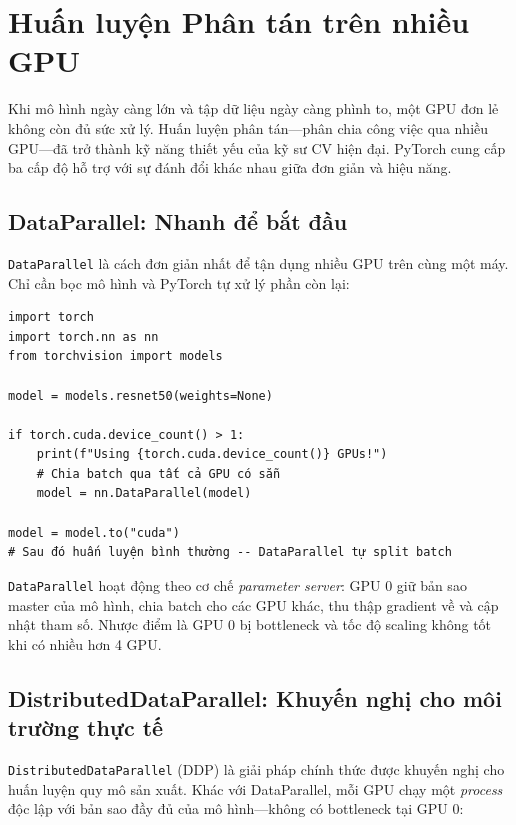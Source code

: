 \section{Huấn luyện Phân tán trên nhiều GPU}
\label{sec:distributed_training}

Khi mô hình ngày càng lớn và tập dữ liệu ngày càng phình to, một GPU đơn lẻ không còn đủ sức xử lý. Huấn luyện phân tán---phân chia công việc qua nhiều GPU---đã trở thành kỹ năng thiết yếu của kỹ sư CV hiện đại. PyTorch cung cấp ba cấp độ hỗ trợ với sự đánh đổi khác nhau giữa đơn giản và hiệu năng.

\subsection*{DataParallel: Nhanh để bắt đầu}

\texttt{DataParallel} là cách đơn giản nhất để tận dụng nhiều GPU trên cùng một máy. Chỉ cần bọc mô hình và PyTorch tự xử lý phần còn lại:

\begin{verbatim}
import torch
import torch.nn as nn
from torchvision import models

model = models.resnet50(weights=None)

if torch.cuda.device_count() > 1:
    print(f"Using {torch.cuda.device_count()} GPUs!")
    # Chia batch qua tất cả GPU có sẵn
    model = nn.DataParallel(model)

model = model.to("cuda")
# Sau đó huấn luyện bình thường -- DataParallel tự split batch
\end{verbatim}

\texttt{DataParallel} hoạt động theo cơ chế \textit{parameter server}: GPU 0 giữ bản sao master của mô hình, chia batch cho các GPU khác, thu thập gradient về và cập nhật tham số. Nhược điểm là GPU 0 bị bottleneck và tốc độ scaling không tốt khi có nhiều hơn 4 GPU.

\subsection*{DistributedDataParallel: Khuyến nghị cho môi trường thực tế}

\texttt{DistributedDataParallel} (DDP) là giải pháp chính thức được khuyến nghị cho huấn luyện quy mô sản xuất. Khác với DataParallel, mỗi GPU chạy một \textit{process} độc lập với bản sao đầy đủ của mô hình---không có bottleneck tại GPU 0:

